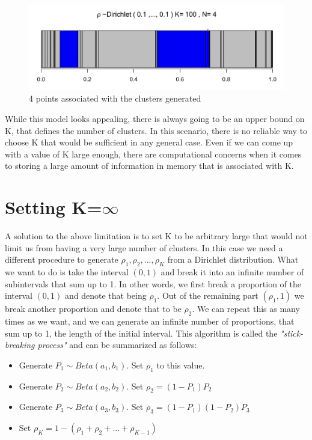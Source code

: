\documentclass[12pt,a4paper]{article}
\begin{document}
\begin{figure} [H]
    \begin{center}
        \includegraphics[scale=1, width=13cm]{clustered_points.png}
        \caption{4 points associated with the clusters generated}
        \label{fig:clustered_points}
    \end{center}
\end{figure}

While this model looks appealing, there is always going to be an upper bound on K, that defines the number of clusters. In this scenario, there is no reliable way to choose K that would be sufficient in any general case. Even if we can come up with a value of K large enough, there are computational concerns when it comes to storing a large amount of information in memory that is associated with K.

\section{Setting K=$\infty$}
A solution to the above limitation is to set K to be arbitrary large that would not limit us from having a very large number of clusters. In this case we need a different procedure to generate $\rho_{1}, \rho_{2}, ..., \rho_{K}$ from a Dirichlet distribution. What we want to do is take the interval $(0, 1)$ and break it into an infinite number of subintervals that sum up to 1. In other words, we first break a proportion of the interval $(0, 1)$ and denote that being $\rho_{1}$. Out of the remaining part $(\rho_{1}, 1)$ we break another proportion and denote that to be $\rho_{2}$. We can repeat this as many times as we want, and we can generate an infinite number of proportions, that sum up to 1, the length of the initial interval. This algorithm is called the \textit{"stick-breaking process"} and can be summarized as follows: 

\begin{itemize}
    \item Generate $P_{1} \sim Beta(a_{1}, b_{1})$. Set $\rho_{1}$ to this value.  
    \item Generate $P_{2} \sim Beta(a_{2}, b_{2})$. Set $\rho_{2} = (1 - P_{1})P_{2}$
    \item Generate $P_{3} \sim Beta(a_{3}, b_{3})$. Set $\rho_{3} = (1 - P_{1})(1-P_{2})P_{3}$
    \item Set $\rho_{K} = 1 - (\rho_{1} + \rho_{2} + ... + \rho_{K-1})$
\end{itemize}
\end{document}
